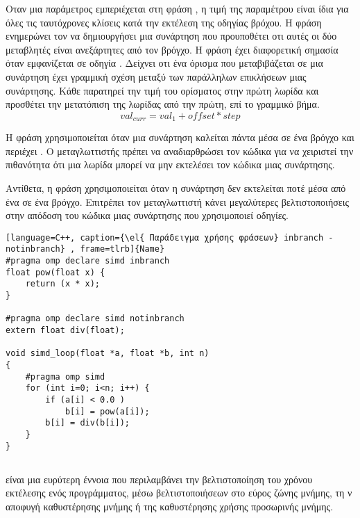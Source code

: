 Οταν μια παράμετρος εμπεριέχεται στη φράση \emph{}, η τιμή της παραμέτρου είναι ίδια για όλες τις ταυτόχρονες κλίσεις κατά την εκτέλεση της οδηγίας \emph{} βρόχου. Η φράση \emph{} ενημερώνει τον \emph{} να δημιουργήσει μια \emph{} συνάρτηση που προυποθέτει οτι αυτές οι δύο μεταβλητές είναι ανεξάρτητες από τον βρόγχο.
Η φράση \emph{} έχει διαφορετική σημασία όταν εμφανίζεται σε οδηγία \emph{}. Δείχνει οτι ένα όρισμα που μεταβιβάζεται σε μια συνάρτηση έχει γραμμική σχέση μεταξύ των παράλληλων επικλήσεων μιας συνάρτησης.
Κάθε \emph{} παρατηρεί την τιμή του ορίσματος στην πρώτη λωρίδα και προσθέτει την μετατόπιση της \emph{} λωρίδας από την πρώτη, επί το γραμμικό βήμα.
$$val_{curr} = val_1 + offset * step $$

Η φράση \emph{} χρησιμοποιείται όταν μια συνάρτηση καλείται πάντα μέσα σε ένα βρόγχο \emph{} και περιέχει \emph{}. Ο μεταγλωττιστής πρέπει να αναδιαρθρώσει τον κώδικα για να χειριστεί την πιθανότητα ότι μια λωρίδα \emph{} μπορεί να μην εκτελέσει τον κώδικα μιας συνάρτησης.

Αντίθετα, η φράση \emph{} χρησιμοποιείται όταν η συνάρτηση δεν εκτελείται ποτέ μέσα από ένα \emph{} σε ένα \emph{} βρόγχο. Επιτρέπει τον μεταγλωττιστή κάνει μεγαλύτερες βελτιστοποιήσεις στην απόδοση του κώδικα μιας συνάρτησης που χρησιμοποιεί \emph{} οδηγίες.

\clearpage
{}
\begin{lstlisting}[language=C++, caption={\el{ Παράδειγμα χρήσης φράσεων} inbranch - notinbranch} , frame=tlrb]{Name}
#pragma omp declare simd inbranch
float pow(float x) {
	return (x * x);
}

#pragma omp declare simd notinbranch
extern float div(float);

void simd_loop(float *a, float *b, int n)
{
	#pragma omp simd
	for (int i=0; i<n; i++) {
		if (a[i] < 0.0 )
			b[i] = pow(a[i]);
		b[i] = div(b[i]);
	}
}
\end{lstlisting}

\clearpage
\subsection{}
\subparagraph{}
\emph{} είναι μια ευρύτερη έννοια που περιλαμβάνει την βελτιστοποίηση του χρόνου εκτέλεσης ενός προγράμματος, μέσω βελτιστοποιήσεων στο εύρος ζώνης μνήμης, τη ν αποφυγή καθυστέρησης μνήμης ή της  καθυστέρησης χρήσης προσωρινής μνήμης.

